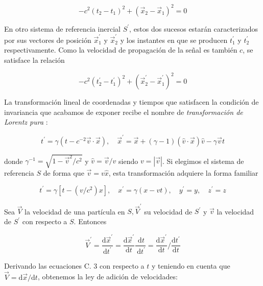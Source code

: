 \begin{equation*}
-c^{2}\left(t_{2}-t_{1}\right)^{2}+\left(\vec{x}_{2}-\vec{x}_{1}\right)^{2}=0 \tag{C.1}
\end{equation*}


En otro sistema de referencia inercial $S^{\prime}$, estos dos sucesos estarán caracterizados por sus vectores de posición $\vec{x}_{1}^{\prime}$ y $\vec{x}_{2}^{\prime}$ y los instantes en que se producen $t_{1}^{\prime}$ y $t_{2}^{\prime}$ respectivamente. Como la velocidad de propagación de la señal es también $c$, se satisface la relación

\begin{equation*}
-c^{2}\left(t_{2}^{\prime}-t_{1}^{\prime}\right)^{2}+\left(\vec{x}_{2}^{\prime}-\vec{x}_{1}^{\prime}\right)^{2}=0 \tag{C.2}
\end{equation*}


La transformación lineal de coordenadas y tiempos que satisfacen la condición de invariancia que acabamos de exponer recibe el nombre de \textit{transformación de Lorentz pura} :

\begin{equation*}
t^{\prime}=\gamma\left(t-c^{-2} \vec{v} \cdot \vec{x}\right), \quad \vec{x}^{\prime}=\vec{x}+(\gamma-1)(\hat{v} \cdot \vec{x}) \hat{v}-\gamma \vec{v} t \tag{C.3}
\end{equation*}

donde $\gamma^{-1}=\sqrt{1-\vec{v}^{2} / c^{2}}$ y $\hat{v}=\vec{v} / v$ siendo $v=|\vec{v}|$. Si elegimos el sistema de referencia $S$ de forma que $\vec{v}=v \hat{x}$, esta transformación adquiere la forma familiar

\[t^{\prime}=\gamma\left[t-\left(v / c^{2}\right) x\right], \quad x^{\prime}=\gamma(x-v t), \quad y^{\prime}=y, \quad z^{\prime}=z\]

Sea $\vec{V}$ la velocidad de una partícula en $S, \vec{V}^{\prime}$ su velocidad de $S^{\prime}$ y $\vec{v}$ la velocidad de $S^{\prime}$ con respecto a $S$. Entonces

\[\vec{V}^{\prime}=\frac{\mathrm{d} \vec{x}^{\prime}}{\mathrm{d} t^{\prime}}=\frac{\mathrm{d} \vec{x}^{\prime}}{\mathrm{d} t} \frac{\mathrm{~d} t}{\mathrm{~d} t^{\prime}}=\frac{\mathrm{d} \vec{x}^{\prime}}{\mathrm{d} t} / \frac{\mathrm{d} t^{\prime}}{\mathrm{d} t}
\]

Derivando las ecuaciones C. 3 con respecto a $t$ y teniendo en cuenta que $\vec{V}=\mathrm{d} \vec{x} / \mathrm{d} t$, obtenemos la ley de adición de velocidades:

